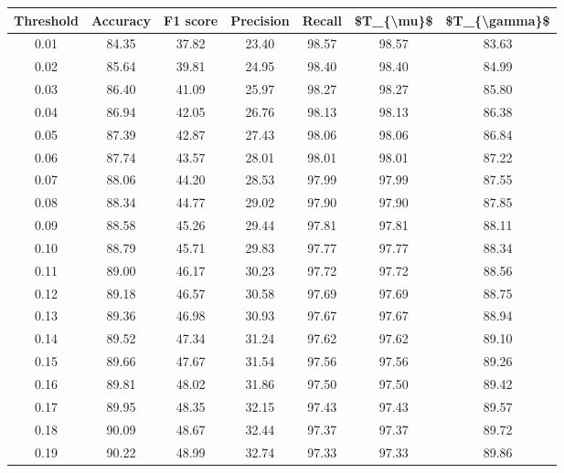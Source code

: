 \begin{tabular}{|c|c|c|c|c|c|c|}
\hline
 Threshold &  Accuracy &  F1 score &  Precision &  Recall &  \$T\_\{\textbackslash mu\}\$ &  \$T\_\{\textbackslash gamma\}\$ \\
\hline
      0.01 &     84.35 &     37.82 &      23.40 &   98.57 &      98.57 &         83.63 \\
      0.02 &     85.64 &     39.81 &      24.95 &   98.40 &      98.40 &         84.99 \\
      0.03 &     86.40 &     41.09 &      25.97 &   98.27 &      98.27 &         85.80 \\
      0.04 &     86.94 &     42.05 &      26.76 &   98.13 &      98.13 &         86.38 \\
      0.05 &     87.39 &     42.87 &      27.43 &   98.06 &      98.06 &         86.84 \\
      0.06 &     87.74 &     43.57 &      28.01 &   98.01 &      98.01 &         87.22 \\
      0.07 &     88.06 &     44.20 &      28.53 &   97.99 &      97.99 &         87.55 \\
      0.08 &     88.34 &     44.77 &      29.02 &   97.90 &      97.90 &         87.85 \\
      0.09 &     88.58 &     45.26 &      29.44 &   97.81 &      97.81 &         88.11 \\
      0.10 &     88.79 &     45.71 &      29.83 &   97.77 &      97.77 &         88.34 \\
      0.11 &     89.00 &     46.17 &      30.23 &   97.72 &      97.72 &         88.56 \\
      0.12 &     89.18 &     46.57 &      30.58 &   97.69 &      97.69 &         88.75 \\
      0.13 &     89.36 &     46.98 &      30.93 &   97.67 &      97.67 &         88.94 \\
      0.14 &     89.52 &     47.34 &      31.24 &   97.62 &      97.62 &         89.10 \\
      0.15 &     89.66 &     47.67 &      31.54 &   97.56 &      97.56 &         89.26 \\
      0.16 &     89.81 &     48.02 &      31.86 &   97.50 &      97.50 &         89.42 \\
      0.17 &     89.95 &     48.35 &      32.15 &   97.43 &      97.43 &         89.57 \\
      0.18 &     90.09 &     48.67 &      32.44 &   97.37 &      97.37 &         89.72 \\
      0.19 &     90.22 &     48.99 &      32.74 &   97.33 &      97.33 &         89.86 \\

\end{tabular}
